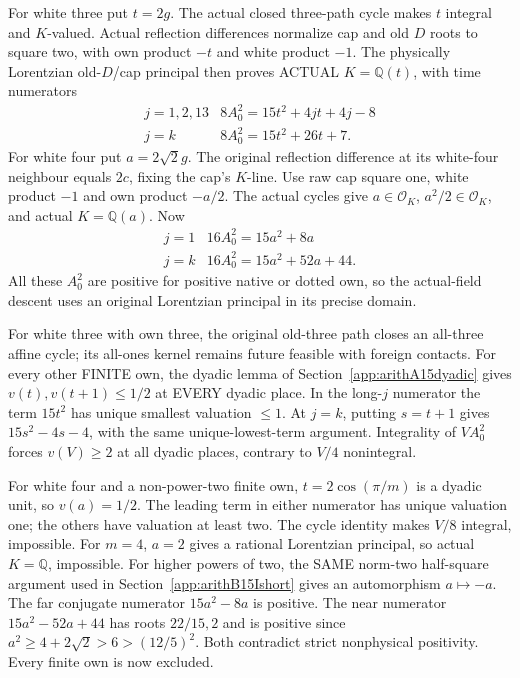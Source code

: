 For white three put \(t=2g\).
The actual closed three-path cycle makes \(t\)
integral and \(K\)-valued.
Actual reflection differences normalize cap and old
\(D\) roots to square two, with own product \(-t\)
and white product \(-1\).
The physically Lorentzian old-\(D\)/cap principal
then proves ACTUAL \(K=\mathbb Q(t)\), with time
numerators
\[
 \begin{array}{c|c}
 j=1,2,13&8A_0^2=15t^2+4jt+4j-8\\
 j=k&8A_0^2=15t^2+26t+7 .
 \end{array}
\]
For white four put \(a=2\sqrt2g\).
The original reflection difference at its white-four
neighbour equals \(2c\), fixing the cap's \(K\)-line.
Use raw cap square one, white product \(-1\)
and own product \(-a/2\).
The actual cycles give \(a\in\mathcal O_K\),
\(a^2/2\in\mathcal O_K\), and actual \(K=\mathbb Q(a)\).
Now
\[
 \begin{array}{c|c}
 j=1&16A_0^2=15a^2+8a\\
 j=k&16A_0^2=15a^2+52a+44 .
 \end{array}
\]
All these \(A_0^2\) are positive for positive native
or dotted own, so the actual-field descent uses
an original Lorentzian principal in its precise domain.

For white three with own three, the original old-three
path closes an all-three affine cycle; its all-ones
kernel remains future feasible with foreign contacts.
For every other FINITE own, the dyadic lemma of
Section~\ref{app:arithA15dyadic} gives
\(v(t),v(t+1)\le1/2\) at EVERY dyadic place.
In the long-\(j\) numerator the term \(15t^2\)
has unique smallest valuation \(\le1\).
At \(j=k\), putting \(s=t+1\) gives
\(15s^2-4s-4\), with the same unique-lowest-term
argument.
Integrality of \(VA_0^2\) forces \(v(V)\ge2\)
at all dyadic places, contrary to \(V/4\) nonintegral.

For white four and a non-power-two finite own,
\(t=2\cos(\pi/m)\) is a dyadic unit,
so \(v(a)=1/2\).
The leading term in either numerator has unique
valuation one; the others have valuation at least two.
The cycle identity makes \(V/8\) integral, impossible.
For \(m=4\), \(a=2\) gives a rational Lorentzian
principal, so actual \(K=\mathbb Q\), impossible.
For higher powers of two, the SAME norm-two
half-square argument used in
Section~\ref{app:arithB15Ishort} gives an
automorphism \(a\mapsto-a\).
The far conjugate numerator \(15a^2-8a\) is positive.
The near numerator \(15a^2-52a+44\) has roots
\(22/15,2\) and is positive since
\(a^2\ge4+2\sqrt2>6>(12/5)^2\).
Both contradict strict nonphysical positivity.
Every finite own is now excluded.

